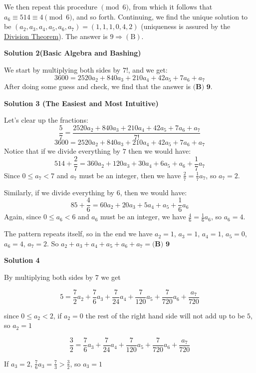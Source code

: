 \begin{enumerate}
 We then repeat this procedure $\pmod{6}$, from which it follows that $a_6 \equiv 514 \equiv 4 \pmod{6}$, and so forth. Continuing, we find the unique solution to be $(a_2, a_3, a_4, a_5, a_6, a_7) = (1,1,1,0,4,2)$ (uniqueness is assured by the \href{https://artofproblemsolving.com/wiki/index.php?title=Division\_Theorem}{Division Theorem}). The answer is $9 \Longrightarrow \boxed{\mathrm{(B)}}$.

 



\textbf{Solution 2(Basic Algebra and Bashing)}

We start by multiplying both sides by $7!$, and we get:
 \[3600=2520a_2+840a_3+210a_4+42a_5+7a_6+a_7\]After doing some guess and check, we find that the answer is $\boxed{\textbf{(B)~9}}$.

 



\textbf{Solution 3 (The Easiest and Most Intuitive)}

Let's clear up the fractions: 
 \[\frac{5}{7}=\frac{2520a_2+840a_3+210a_4+42a_5+7a_6+a_7}{7!}\]
 \[3600=2520a_2+840a_3+210a_4+42a_5+7a_6+a_7\]Notice that if we divide everything by $7$ then we would have:
 \[514+\frac{2}{7}=360a_2+120a_3+30a_4+6a_5+a_6+\frac{1}{7}a_7\]Since $0 \le a_7<7$ and $a_7$ must be an integer, then we have $\frac{2}{7}=\frac{1}{7}a_7$, so $a_7=2$.

 Similarly, if we divide everything by $6$, then we would have: 
 \[85+\frac{4}{6}=60a_2+20a_3+5a_4+a_5+\frac{1}{6}a_6\]Again, since $0 \le a_6<6$ and $a_6$ must be an integer, we have $\frac{4}{6}=\frac{1}{6}a_6$, so $a_6=4$.

 The pattern repeats itself, so in the end we have $a_2=1$, $a_3=1$, $a_4=1$, $a_5=0$, $a_6=4$, $a_7=2$. So $a_2+a_3+a_4+a_5+a_6+a_7=\boxed{\textbf{(B)~9}}$




\textbf{Solution 4}

By multiplying both sides by $7$ we get 

 
 \[5 = \frac72 a_2 + \frac76 a_3+ \frac{7}{24} a_4 + \frac{7}{120} a_5 + \frac{7}{720} a_6 + \frac{a_7}{720}\]

 since $0 \le a_2 < 2$, if $a_2 = 0$ the rest of the right hand side will not add up to be $5$, so $a_2 = 1$

 \[\frac32 = \frac76 a_3+ \frac{7}{24} a_4 + \frac{7}{120} a_5 + \frac{7}{720} a_6 + \frac{a_7}{720}\]

 If $a_3 = 2$, $\frac76 a_3 = \frac73 > \frac32$, so $a_3 = 1$


\end{enumerate}
